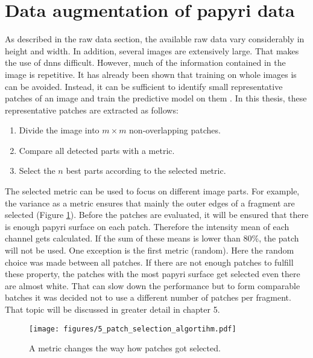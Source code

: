 \section{Data augmentation of papyri data}
\label{sec:fragmentation}
As described in the raw data section, the available raw data vary considerably in height and width. In addition, several images are extensively large. That makes the use of \acp{dnn} difficult. However, much of the information contained in the image is repetitive. It has already been shown that training on whole images is can be avoided. Instead, it can be sufficient to identify small representative patches of an image and train the predictive model on them \cite{Pirrone21, Ostertag21}. In this thesis, these representative patches are extracted as follows:
%
\begin{enumerate}
	\item Divide the image into \(m \times m\) non-overlapping patches.
	\item Compare all detected parts with a metric.
	\item Select the \(n\) best parts according to the selected metric.
\end{enumerate}
%
The selected metric can be used to focus on different image parts. For example, the variance as a metric ensures that mainly the outer edges of a fragment are selected (Figure \ref{fig:patchSelection}). Before the patches are evaluated, it will be ensured that there is enough papyri surface on each patch. Therefore the intensity mean of each channel gets calculated. If the sum of these means is lower than 80\%, the patch will not be used. One exception is the first metric (random). Here the random choice was made between all patches. If there are not enough patches to fulfill these property, the patches with the most papyri surface get selected even there are almost white. That can slow down the performance but to form comparable batches it was decided not to use a different number of patches per fragment. That topic will be discussed in greater detail in chapter 5. 
%
\begin{figure}[t]
	\label{fig:patchSelection}
	\texttt{[image: figures/5\_patch\_selection\_algortihm.pdf]}
	\caption{A metric changes the way how patches got selected.}
\end{figure}
%
